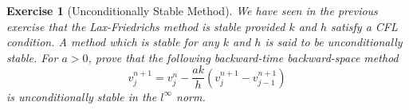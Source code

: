 \documentclass[10pt,letterpaper]{article}
\theoremstyle{break}
\newtheorem{exercise}{Exercise}
\begin{document}
\begin{exercise}[Unconditionally Stable Method]
	We have seen in the previous exercise that the Lax-Friedrichs
	method is stable provided $k$ and $h$ satisfy a CFL condition.
	A method which is stable for any $k$ and $h$ is said to be
	\textit{unconditionally stable}.
	For $a>0$, prove that the following backward-time backward-space method
	$$
		v_{j}^{n+1}=v_j^n-\frac{ak}{h}(v_{j}^{n+1}-v_{j-1}^{n+1})
	$$
	is unconditionally stable in the $l^\infty$ norm.
\end{exercise}
\end{document}
